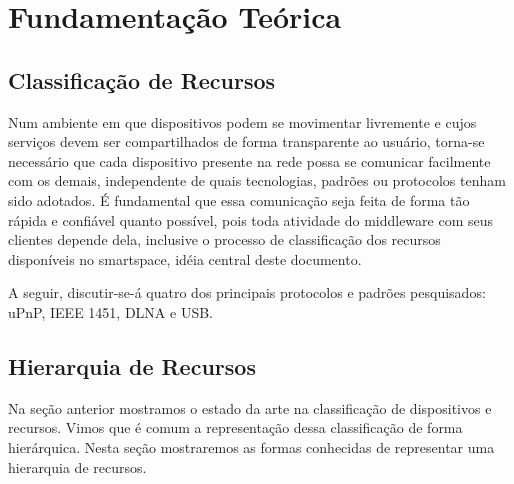 \chapter{Fundamentação Teórica}

\section{Classificação de Recursos}

Num ambiente em que dispositivos podem se movimentar livremente e cujos serviços devem ser compartilhados de forma transparente ao usuário, torna-se necessário que cada dispositivo presente na rede possa se comunicar facilmente com os demais, independente de quais tecnologias, padrões ou protocolos tenham sido adotados. É fundamental que essa comunicação seja feita de forma tão rápida e confiável quanto possível, pois toda atividade do middleware com seus clientes depende dela, inclusive o processo de classificação dos recursos disponíveis no smartspace, idéia central deste documento.

\begin{comment}
É importante, também, que a classificação dos recursos disponibilizados por cada aparelho presente na rede. Dessa forma, torna-se de grande valia o conhecimento prévio de quais padrões e protocolos estão sendo atualmente adotados pelas principais fabricantes de produtos eletrônicos.
\end{comment}

A seguir, discutir-se-á quatro dos principais protocolos e padrões pesquisados: uPnP, IEEE 1451, DLNA e USB.

\begin{comment}
Existem diferentes formas de fazer uma classificação para dispositivos ou recursos.
Nesta seção falaremos sobre algumas tecnologias que fazem uso de uma classificação de dispositivos para auxiliar a comunicação entre eles e o desenvolvimento de aplicações para estes dispositivos.
\end{comment}






\section{Hierarquia de Recursos}
Na seção anterior mostramos o estado da arte na classificação de dispositivos e recursos. Vimos que é comum a representação dessa classificação de forma hierárquica. Nesta seção mostraremos as formas conhecidas de representar uma hierarquia de recursos.



